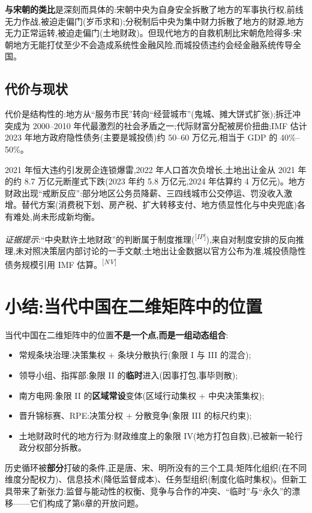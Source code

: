 \documentclass[UTF8,12pt,a4paper]{ctexrep}
\newcommand{\src}[1]{\textsuperscript{[\emph{#1}]}}
\begin{document}
\textbf{与宋朝的类比}是深刻而具体的:宋朝中央为自身安全拆散了地方的军事执行权,前线无力作战,被迫走偏门(岁币求和);分税制后中央为集中财力拆散了地方的财源,地方无力正常运转,被迫走偏门(土地财政)。但现代地方的自救机制比宋朝危险得多:宋朝地方无能打仗至少不会造成系统性金融风险,而城投债违约会经金融系统传导全国。

\subsection{代价与现状}

代价是结构性的:地方从``服务市民''转向``经营城市''(鬼城、摊大饼式扩张);拆迁冲突成为 2000--2010 年代最激烈的社会矛盾之一;代际财富分配被房价扭曲;IMF 估计 2023 年地方政府隐性债务(主要是城投债)约 50--60 万亿元,相当于 GDP 的 40\%--50\%。

2021 年恒大违约引发房企连锁爆雷,2022 年人口首次负增长,土地出让金从 2021 年的约 8.7 万亿元断崖式下跌(2023 年约 5.8 万亿元,2024 年估算约 4 万亿元)。地方财政出现``戒断反应'':部分地区公务员降薪、三四线城市公交停运、罚没收入激增。替代方案(消费税下划、房产税、扩大转移支付、地方债显性化与中央兜底)各有难处,尚未形成新均衡。

\emph{证据提示}:``中央默许土地财政''的判断属于制度推理(\src{IP}),来自对制度安排的反向推理,未对照决策层内部讨论的一手文献;土地出让金数据以官方公布为准,城投债隐性债务规模引用 IMF 估算。\src{NV}

\section{小结:当代中国在二维矩阵中的位置}

当代中国在二维矩阵中的位置\textbf{不是一个点,而是一组动态组合}:

\begin{itemize}
  \item 常规条块治理:决策集权 + 条块分散执行(象限 I 与 III 的混合);
  \item 领导小组、指挥部:象限 II 的\textbf{临时}进入(因事打包,事毕则散);
  \item 南方电网:象限 II 的\textbf{区域常设}变体(区域行动集权 + 中央决策集权);
  \item 晋升锦标赛、RPE:决策分权 + 分散竞争(象限 III 的标尺约束);
  \item 土地财政时代的地方行为:财政维度上的象限 IV(地方打包自救),已被新一轮行政分权部分拆散。
\end{itemize}

历史循环被\textbf{部分}打破的条件,正是唐、宋、明所没有的三个工具:矩阵化组织(在不同维度分配权力)、信息技术(降低监督成本)、任务型组织(制度化临时集权)。但新工具带来了新张力:监督与能动性的权衡、竞争与合作的冲突、``临时''与``永久''的漂移——它们构成了第6章的开放问题。
\end{document}
